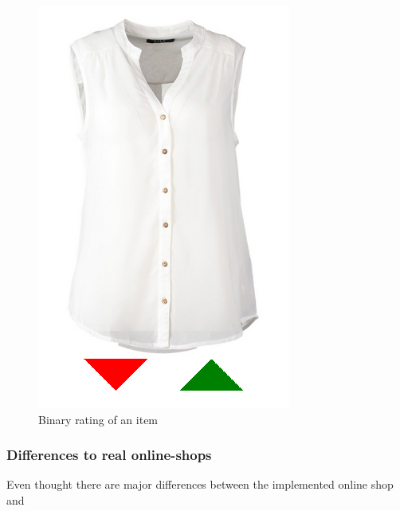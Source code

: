 \begin{figure}[h]
    \center
    \includegraphics[scale=0.3]{inc/implementation/onlineshop/recommender-onlineshop-binary_rating}
    \caption{Binary rating of an item}
    \label{fig:onlineshop-explicit-rating}
\end{figure}


\subsubsection{Differences to real online-shops}
Even thought there are major differences between the implemented online shop and

